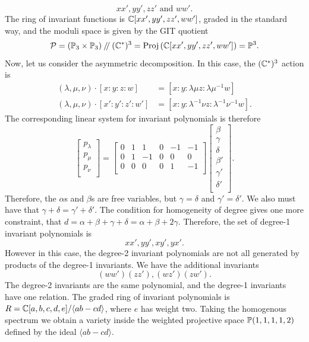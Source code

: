 	\begin{equation}
		xx', yy', zz' \text{ and } ww'.
	\end{equation}
	The ring of invariant functions is $\mathbb{C}[xx',yy',zz',ww']$, graded in the standard way, and the moduli space is given by the GIT quotient
	\begin{equation}
		\mathcal{P} = (\mathbb{P}_3 \times \mathbb{P}_3)\mathbin{/\mkern-4mu/} (\mathbb{C}^\ast)^3 = \text{Proj} \left(\mathbb{C}[xx',yy',zz',ww']\right) = \mathbb{P}^3.
	\end{equation}
	Now, let us consider the asymmetric decomposition. In this case, the $(\mathbb{C}^\ast)^3$ action is
	\begin{align*}
	(\lambda, \mu,\nu)\cdot [x:y:z:w] &= [x:y: \lambda \mu z: \lambda\mu^{-1} w]\\
	(\lambda, \mu,\nu)\cdot [x':y':z':w'] &= [x: y: \lambda^{-1} \nu z: \lambda^{-1}\nu^{-1} w].
	\end{align*}
	The corresponding linear system for invariant polynomials is therefore
		\begin{equation}
	\begin{bmatrix}
	p_\lambda \\
	p_\mu \\
	p_\nu \\
	\end{bmatrix} = \begin{bmatrix}
	0 & 1 & 1 & 0 & -1 & -1\\
	0 & 1 & -1 & 0 & 0 & 0\\
	0 & 0 & 0 & 0 & 1 & -1\\
	\end{bmatrix}\begin{bmatrix}
	\beta \\
	\gamma \\
	\delta \\
	\beta' \\
	\gamma'\\
	\delta '\\
	\end{bmatrix}.
	\end{equation}
	Therefore, the $\alpha$s and $\beta$s are free variables, but $\gamma = \delta$ and $\gamma' = \delta'$. We also must have that $\gamma+\delta = \gamma'+\delta'$. The condition for homogeneity of degree gives one more constraint, that $d=\alpha+\beta+\gamma+\delta = \alpha + \beta + 2\gamma$. Therefore, the set of degree-1 invariant polynomials is
	\begin{equation}
		xx', yy', xy', yx'.
	\end{equation}
	However in this case, the degree-2 invariant polynomials are not all generated by products of the degree-1 invariants. We have the additional invariants
	\begin{equation}
		(ww')(zz'), (wz')(zw').
	\end{equation}
	The degree-2 invariants are the same polynomial, and the degree-1 invariants have one relation. The graded ring of invariant polynomials is $R=\mathbb{C}[a,b,c,d,e]/\langle ab-cd\rangle$, where $e$ has weight two. Taking the homogenous spectrum we obtain a variety inside the weighted projective space $\mathbb{P}(1,1,1,1,2)$ defined by the ideal $\langle ab-cd\rangle$.
	
